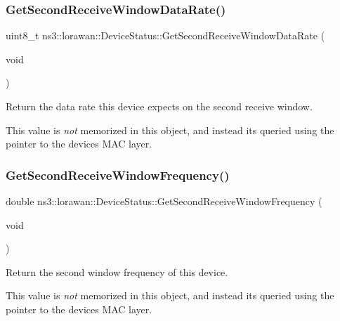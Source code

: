 \subsubsection{\texorpdfstring{Get\+Second\+Receive\+Window\+Data\+Rate()}{GetSecondReceiveWindowDataRate()}}
{\footnotesize\ttfamily uint8\+\_\+t ns3\+::lorawan\+::\+Device\+Status\+::\+Get\+Second\+Receive\+Window\+Data\+Rate (\begin{DoxyParamCaption}\item[{void}]{ }\end{DoxyParamCaption})}

Return the data rate this device expects on the second receive window.

This value is {\itshape not} memorized in this object, and instead it\textquotesingle{}s queried using the pointer to the device\textquotesingle{}s M\+AC layer. \mbox{\label{classns3_1_1lorawan_1_1DeviceStatus_a3b908979aaebd791d3c54196fcf938f1}} 
\subsubsection{\texorpdfstring{Get\+Second\+Receive\+Window\+Frequency()}{GetSecondReceiveWindowFrequency()}}
{\footnotesize\ttfamily double ns3\+::lorawan\+::\+Device\+Status\+::\+Get\+Second\+Receive\+Window\+Frequency (\begin{DoxyParamCaption}\item[{void}]{ }\end{DoxyParamCaption})}

Return the second window frequency of this device.

This value is {\itshape not} memorized in this object, and instead it\textquotesingle{}s queried using the pointer to the device\textquotesingle{}s M\+AC layer. \mbox{\label{classns3_1_1lorawan_1_1DeviceStatus_a6174dfca1f330b02f833683117acecdb}} 
